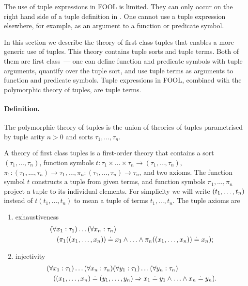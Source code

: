The use of tuple expressions in FOOL is limited. They can only occur on the right hand side of a tuple definition in \LETIN. One cannot use a tuple expression elsewhere, for example, as an argument to a function or predicate symbol.

In this section we describe the theory of first class tuples that enables a more generic use of tuples. This theory contains tuple sorts and tuple terms. Both of them are first class~--- one can define function and predicate symbols with tuple arguments, quantify over the tuple sort, and use tuple terms as arguments to function and predicate symbols. Tuple expressions in FOOL, combined with the polymorphic theory of tuples, are tuple terms.

\paragraph*{\bf Definition.}
The polymorphic theory of tuples is the union of theories of tuples parametrised by tuple arity $n > 0$ and sorts $\tau_1,\ldots,\tau_n$.

A theory of first class tuples is a first-order theory that contains a sort $(\tau_1,\ldots,\tau_n)$, function symbols $t:\tau_1\times\ldots\times\tau_n\to(\tau_1,\ldots,\tau_n)$, $\pi_1:(\tau_1,\ldots,\tau_n)\to\tau_1,\ldots,\pi_n:(\tau_1,\ldots,\tau_n)\to\tau_n$, and two axioms. The function symbol $t$ constructs a tuple from given terms, and function symbols $\pi_1,\ldots,\pi_n$ project a tuple to its individual elements. For simplicity we will write $({t_1,\ldots,t_n})$ instead of $t(t_1,\ldots,t_n)$ to mean a tuple of terms $t_1,\ldots,t_n$. The tuple axioms are
\begin{enumerate}
  \item exhaustiveness
        \begin{align*}
          &(\forall x_1:\tau_1)\ldots(\forall x_n:\tau_n)\\
          &\quad(\pi_1(({x_1,\ldots,x_n}))\doteq x_1 \wedge \ldots \wedge \pi_n(({x_1,\ldots,x_n}))\doteq x_n);
        \end{align*}
  \item injectivity
        \begin{align*}
          &(\forall x_1:\tau_1)\ldots(\forall x_n:\tau_n)(\forall y_1:\tau_1)\ldots(\forall y_n:\tau_n)\\
          &\quad(({x_1,\ldots,x_n}) \doteq ({y_1,\ldots,y_n}) \Rightarrow x_1 \doteq y_1 \wedge \ldots \wedge x_n \doteq y_n).
        \end{align*}
\end{enumerate}

